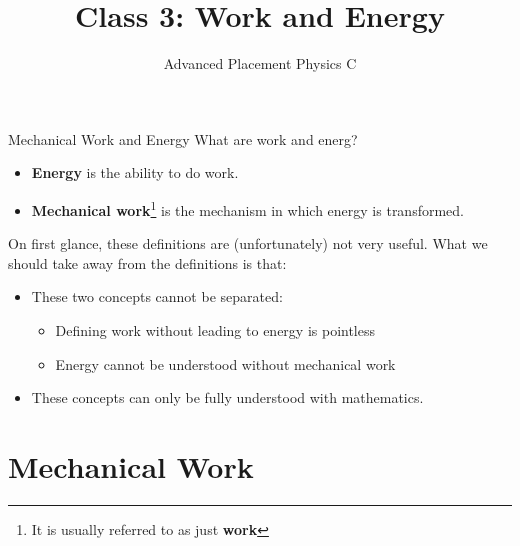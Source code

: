 \documentclass[12pt,compress,aspectratio=169]{beamer}
\title{Class 3: Work and Energy}
\subtitle{Advanced Placement Physics C}
\begin{document}
\begin{frame}
  \maketitle
\end{frame}



\begin{frame}{Mechanical Work and Energy}
  What are work and energ?
  \begin{itemize}
  \item\textbf{Energy} is the ability to do work.
  \item\textbf{Mechanical work}\footnote{It is usually referred to as just
  \textbf{work}} is the mechanism in which energy is transformed.
  \end{itemize}
  On first glance, these definitions are (unfortunately) not very useful. What
  we should take away from the definitions is that:
  \begin{itemize}
  \item These two concepts cannot be separated:
    \begin{itemize}
    \item Defining work without leading to energy is pointless
    \item Energy cannot be understood without mechanical work
    \end{itemize}
  \item These concepts can only be fully understood with mathematics.
  \end{itemize}
\end{frame}


\section{Mechanical Work}
\end{document}
